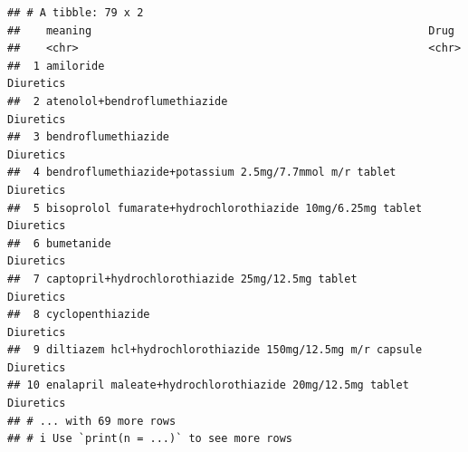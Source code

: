 \documentclass[
]{article}
\begin{document}
\begin{verbatim}
## # A tibble: 79 x 2
##    meaning                                                    Drug     
##    <chr>                                                      <chr>    
##  1 amiloride                                                  Diuretics
##  2 atenolol+bendroflumethiazide                               Diuretics
##  3 bendroflumethiazide                                        Diuretics
##  4 bendroflumethiazide+potassium 2.5mg/7.7mmol m/r tablet     Diuretics
##  5 bisoprolol fumarate+hydrochlorothiazide 10mg/6.25mg tablet Diuretics
##  6 bumetanide                                                 Diuretics
##  7 captopril+hydrochlorothiazide 25mg/12.5mg tablet           Diuretics
##  8 cyclopenthiazide                                           Diuretics
##  9 diltiazem hcl+hydrochlorothiazide 150mg/12.5mg m/r capsule Diuretics
## 10 enalapril maleate+hydrochlorothiazide 20mg/12.5mg tablet   Diuretics
## # ... with 69 more rows
## # i Use `print(n = ...)` to see more rows
\end{verbatim}
\end{document}
